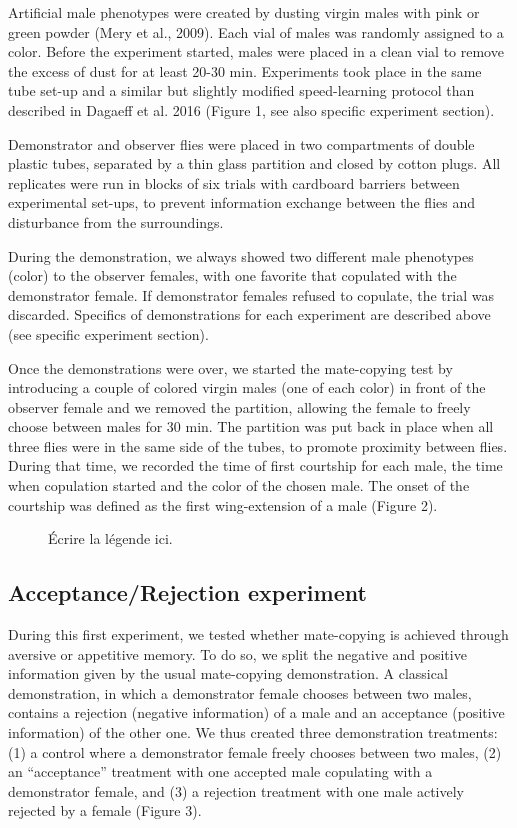 \documentclass[a4paper, 12pt]{article}
\begin{document}
	Artificial male phenotypes were created by dusting virgin males with pink or green powder (Mery et al., 2009). Each vial of males was randomly assigned to a color. Before the experiment started, males were placed in a clean vial to remove the excess of dust for at least 20-30 min. Experiments took place in the same tube set-up and a similar but slightly modified speed-learning protocol than described in Dagaeff et al. 2016 (Figure 1, see also specific experiment section).
	
	Demonstrator and observer flies were placed in two compartments of double plastic tubes, separated by a thin glass partition and closed by cotton plugs. All replicates were run in blocks of six trials with cardboard barriers between experimental set-ups, to prevent information exchange between the flies and disturbance from the surroundings. 
	
	During the demonstration, we always showed two different male phenotypes (color) to the observer females, with one favorite that copulated with the demonstrator female. If demonstrator females refused to copulate, the trial was discarded. Specifics of demonstrations for each experiment are described above (see specific experiment section).
	
	Once the demonstrations were over, we started the mate-copying test by introducing a couple of colored virgin males (one of each color) in front of the observer female and we removed the partition, allowing the female to freely choose between males for 30 min. The partition was put back in place when all three flies were in the same side of the tubes, to promote proximity between flies. During that time, we recorded the time of first courtship for each male, the time when copulation started and the color of the chosen male. The onset of the courtship was defined as the first wing-extension of a male (Figure 2).

	\begin{figure}
		\centering
		\caption{Écrire la légende ici.}
	\end{figure}

	\subsection{Acceptance/Rejection experiment}
	
	During this first experiment, we tested whether mate-copying is achieved through aversive or appetitive memory. To do so, we split the negative and positive information given by the usual mate-copying demonstration. A classical demonstration, in which a demonstrator female chooses between two males, contains a rejection (negative information) of a male and an acceptance (positive information) of the other one. We thus created three demonstration treatments: (1) a control where a demonstrator female freely chooses between two males, (2) an “acceptance” treatment with one accepted male copulating with a demonstrator female, and (3) a rejection treatment with one male actively rejected by a female (Figure 3).
	
\end{document}

